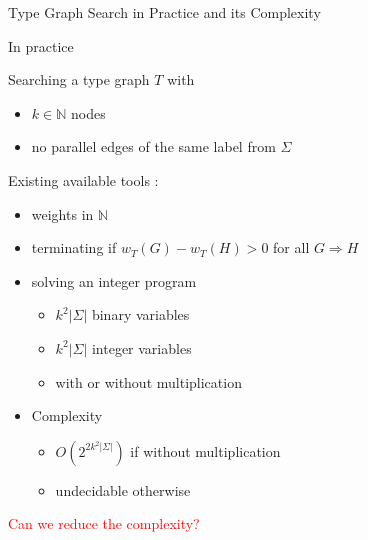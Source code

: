 \documentclass{beamer}
\begin{document}
\begin{frame}{Type Graph Search in Practice and its Complexity
   }

    In practice

      Searching a type graph \( T \) with
      \begin{itemize}
        \item $k \in \mathbb{N}$ nodes
        \item no parallel edges of the same label from $\Sigma$
      \end{itemize} 
      
      Existing available tools : 
      \begin{itemize}
          \item weights in $\mathbb{N}$ 
          \item terminating if $w_T(G) - w_T(H) > 0$ for all $G \Rightarrow H$
          \item solving an integer program 
                \begin{itemize}
                  \item $k^2|\Sigma|$ binary variables
                  \item $k^2|\Sigma|$ integer variables
                  \item with or without multiplication
                \end{itemize} 
          \item Complexity 
              \begin{itemize}
                \item $O(2^{2k^2|\Sigma|})$ if without multiplication
                \item undecidable otherwise
              \end{itemize}
      \end{itemize}


    \textcolor{red}{Can we reduce the complexity?}
\end{frame}
\end{document}
